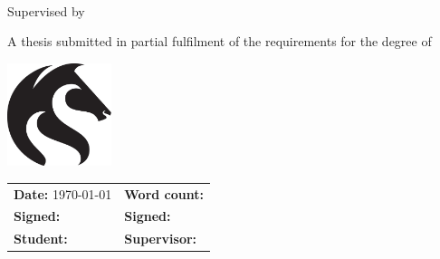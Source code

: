 
\begin{titlepage}
\makeatletter

	\vspace*{\fill}

	{
		\huge{\textbf{\textsf{\@title}}}
		\par
	}

	\vspace{0.25cm}\par
	{
		\textsf{\LARGE\textbf{\@author}} \\
		\large{Supervised by \supervisor}
		\par
	}
	\vspace{0.25cm}\par

	{
		\Large{A thesis submitted in partial fulfilment of the requirements for the degree of \degree}
		\par
	}

	\vspace{1.5cm}\par

	\begin{center}
		\includegraphics[height=3cm]{images/title/uon_logo}
		\vspace{0.25cm}\par
		\Large{\institute}
	\end{center}

	\vspace*{\fill}

	\sffamily
	\vspace{0.25cm}\par
	\begin{tabularx}{\textwidth}{@{}XX@{}}
		\textbf{Date:} \today & \textbf{Word count:} \wordcount \\
		\textbf{Signed:} \dotfill & \textbf{Signed:} \dotfill \\
		\textbf{Student:} \dotfill & \textbf{Supervisor:} \dotfill \\
	\end{tabularx}

\makeatother
\end{titlepage}
